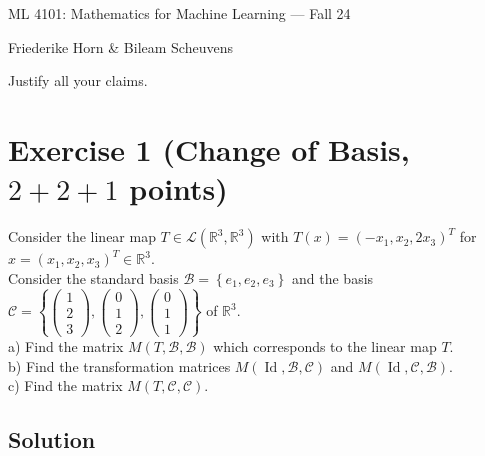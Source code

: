 \documentclass[10pt]{article}
\numberwithin{equation}{section}
\begin{document}
\begin{center}
    \sc ML 4101: Mathematics for Machine Learning --- Fall 24
\end{center}

\noindent Friederike Horn \& Bileam Scheuvens

Justify all your claims.
\section{Exercise 1 (Change of Basis, $2+2+1$ points)}
Consider the linear map $T \in \mathcal{L}\left(\mathbb{R}^3, \mathbb{R}^3\right)$ with $T(x)=\left(-x_1, x_2, 2 x_3\right)^T$ for $x=\left(x_1, x_2, x_3\right)^T \in \mathbb{R}^3$. \\ Consider the standard basis $\mathcal{B}=\left\{e_1, e_2, e_3\right\}$ and the basis $\mathcal{C}=\left\{\left(\begin{array}{l}1 \\ 2 \\ 3\end{array}\right),\left(\begin{array}{l}0 \\ 1 \\ 2\end{array}\right),\left(\begin{array}{l}0 \\ 1 \\ 1\end{array}\right)\right\}$ of $\mathbb{R}^3$.
\\

a) Find the matrix $M(T, \mathcal{B}, \mathcal{B})$ which corresponds to the linear map $T$.\\

b) Find the transformation matrices $M(\operatorname{Id}, \mathcal{B}, \mathcal{C})$ and  $M(\operatorname{Id}, \mathcal{C}, \mathcal{B})$. \\

c) Find the matrix $M(T, \mathcal{C}, \mathcal{C})$.

\subsection{Solution}
\end{document}
